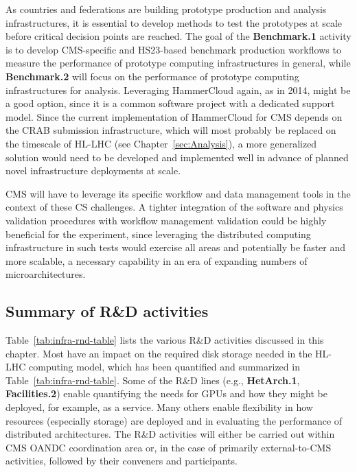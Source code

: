 As countries and federations are building prototype production and analysis infrastructures, it is essential to develop methods to test the prototypes at scale before critical decision points are reached. The goal of the \textbf{Benchmark.1} activity is to develop CMS-specific and HS23-based benchmark production workflows to measure the performance of prototype computing infrastructures in general, while
\textbf{Benchmark.2} will focus on the performance of prototype computing infrastructures for analysis. Leveraging HammerCloud again, as in 2014, might be a good option, since it is a common software project with a dedicated support model. Since the current implementation of HammerCloud for CMS depends on the CRAB submission infrastructure, which will most probably be replaced on the timescale of \gls{HL-LHC} (see Chapter~\ref{sec:Analysis}), a more generalized solution would need to be developed and implemented well in advance of planned novel infrastructure deployments at scale. 

CMS will have to leverage its specific workflow and data management tools in the context of these \gls{CS} challenges. A tighter integration of the software and physics validation procedures with workflow management validation could be highly beneficial for the experiment, since leveraging the distributed computing infrastructure in such tests would exercise all areas and potentially be faster and more scalable, a necessary capability in an era of expanding numbers of microarchitectures. 


\subsection{Summary of R\&D activities}

Table~\ref{tab:infra-rnd-table} lists the various R\&D activities discussed in this chapter. Most have an impact on the required disk storage needed in the \gls{HL-LHC} computing model, which has been quantified and summarized in Table~\ref{tab:infra-rnd-table}. Some of the R\&D lines (e.g., \textbf{HetArch.1}, \textbf{Facilities.2}) enable quantifying the needs for \glspl{GPU} and how they might be deployed, for example, as a service. Many others enable flexibility in how resources (especially storage) are deployed and in evaluating the performance of distributed architectures. The R\&D activities will either be carried out within CMS \gls{OANDC} coordination area or, in the case of primarily external-to-CMS activities, followed by their conveners and participants.

